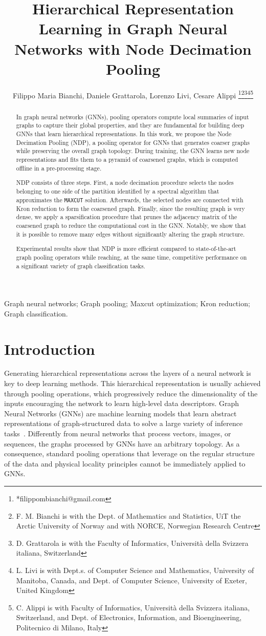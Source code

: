 \documentclass[journal]{IEEEtran}
\title{Hierarchical Representation Learning in Graph Neural Networks with Node Decimation Pooling}
\author{Filippo Maria Bianchi, Daniele Grattarola, Lorenzo Livi, Cesare Alippi \thanks{*filippombianchi@gmail.com}\thanks{F. M. Bianchi is with the Dept. of Mathematics and Statistics, UiT the Arctic University of Norway and with NORCE, Norwegian Research Centre}\thanks{D. Grattarola is with the Faculty of Informatics, Universit\`a della Svizzera italiana, Switzerland}\thanks{L. Livi is with Dept.s. of Computer Science and Mathematics, University of Manitoba, Canada, and Dept. of Computer Science, University of Exeter, United Kingdom}\thanks{C. Alippi is with Faculty of Informatics, Universit\`a della Svizzera italiana, Switzerland, and Dept. of Electronics, Information, and Bioengineering, Politecnico di Milano, Italy}}
\newcommand{\maxcut}{\texttt{\small{MAXCUT}}}
\begin{document}
\maketitle

\begin{abstract}
In graph neural networks (GNNs), pooling operators compute local summaries of input graphs to capture their global properties, and they are fundamental for building deep GNNs that learn hierarchical representations. 
In this work, we propose the Node Decimation Pooling (NDP), a pooling operator for GNNs that generates coarser graphs while preserving the overall graph topology. 
During training, the GNN learns new node representations and fits them to a pyramid of coarsened graphs, which is computed offline in a pre-processing stage.

NDP consists of three steps. 
First, a node decimation procedure selects the nodes belonging to one side of the partition identified by a spectral algorithm that approximates the \maxcut{} solution.
Afterwards, the selected nodes are connected with Kron reduction to form the coarsened graph.
Finally, since the resulting graph is very dense, we apply a sparsification procedure that prunes the adjacency matrix of the coarsened graph to reduce the computational cost in the GNN.
Notably, we show that it is possible to remove many edges without significantly altering the graph structure.

Experimental results show that NDP is more efficient compared to state-of-the-art graph pooling operators while reaching, at the same time, competitive performance on a significant variety of graph classification tasks. 
\end{abstract}
\begin{IEEEkeywords}
Graph neural networks; Graph pooling; Maxcut optimization; Kron reduction; Graph classification.
\end{IEEEkeywords}

\section{Introduction}

Generating hierarchical representations across the layers of a neural network is key to deep learning methods. This hierarchical representation is usually achieved through pooling operations, which progressively reduce the dimensionality of the inputs encouraging the network to learn high-level data descriptors.
Graph Neural Networks (GNNs) are machine learning models that learn abstract representations of graph-structured data to solve a large variety of inference tasks~\cite{7974879, zhang2019depth, bai2019learning, bai2019deep, zhang2018end}.
Differently from neural networks that process vectors, images, or sequences, the graphs processed by GNNs have an arbitrary topology. 
As a consequence, standard pooling operations that leverage on the regular structure of the data and physical locality principles cannot be immediately applied to GNNs. 
\end{document}
